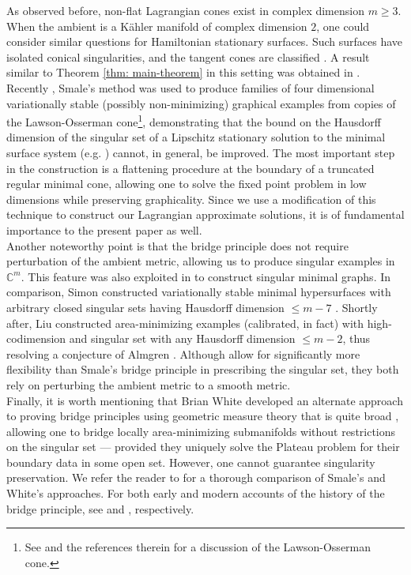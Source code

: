 \documentclass[11pt]{amsart}
\theoremstyle{definition}
\theoremstyle{remark}
\begin{document}
As observed before, non-flat Lagrangian cones exist in complex dimension $m\geq 3$. When the ambient is a K\"ahler manifold of complex dimension $2$, one could consider similar questions for Hamiltonian stationary surfaces. Such surfaces have isolated conical singularities, and the tangent cones are classified \cite{Schoen-Wolfson, Pigati-Riviere}. A result similar to Theorem \ref{thm: main-theorem} in this setting was obtained in \cite{GOR}. Recently \cite{Dim25}, Smale's method was used to produce families of four dimensional variationally stable (possibly non-minimizing) graphical examples from copies of the Lawson-Osserman cone\footnote{See \cite{Dim25} and the references therein for a discussion of the Lawson-Osserman cone.}, demonstrating that the bound on the Hausdorff dimension of the singular set of a Lipschitz stationary solution to the minimal surface system (e.g. \cite[Theorem 3.7]{Dim23}) cannot, in general, be improved. The most important step in the construction is a flattening procedure at the boundary of a truncated regular minimal cone, allowing one to solve the fixed point problem in low dimensions while preserving graphicality. Since we use a modification of this technique to construct our Lagrangian approximate solutions, it is of fundamental importance to the present paper as well.\\ 

Another noteworthy point is that the bridge principle does not require perturbation of the ambient metric, allowing us to produce singular examples in $\mathbb{C}^m$. This feature was also exploited in \cite{Dim25} to construct singular minimal graphs. In comparison, Simon constructed variationally stable minimal hypersurfaces with arbitrary closed singular sets having Hausdorff dimension $\leq m-7$ \cite{Sim23}. Shortly after, Liu constructed area-minimizing examples (calibrated, in fact) with high-codimension and singular set with any Hausdorff dimension $\leq m-2$, thus resolving a conjecture of Almgren \cite{Liu25}. Although \cite{Sim23, Liu25} allow for significantly more flexibility than Smale's bridge principle in prescribing the singular set, they both rely on perturbing the ambient metric to a smooth metric.\\ 

Finally, it is worth mentioning that Brian White developed an alternate approach to proving bridge principles using geometric measure theory that is quite broad \cite{Wh941, Wh942}, allowing one to bridge locally area-minimizing submanifolds without restrictions on the singular set --- provided they uniquely solve the
Plateau problem for their boundary data in some open set. However, one cannot guarantee singularity preservation. We refer the reader to \cite[Section 1 \& Section 6]{Dim25} for a thorough comparison of Smale's and White's approaches. For both early and modern accounts of the history of the bridge principle, see \cite{Wh941} and \cite{Dim25}, respectively.
\end{document}
